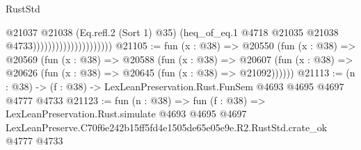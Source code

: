 \begin{lexlean}{RustStd}
\begin{coremodule}
                                          @21037
                                            @21038
                                            (Eq.refl.{2} (Sort 1) @35)
                                            (heq_of_eq.{1}
                                              @4718
                                              @21035
                                              @21038
                                              @4733)))))))))))))))))))))
@21105 := fun (x : @38) =>
  @20550
    (fun (x : @38) =>
    @20569
      (fun (x : @38) =>
      @20588
        (fun (x : @38) =>
        @20607 (fun (x : @38) => @20626 (fun (x : @38) => @20645 (fun (x : @38) => @21092))))))
@21113 := (n : @38) -> (f : @38) -> LexLeanPreservation.Rust.FunSem @4693 @4695 @4697 @4777 @4733
@21123 := fun (n : @38) =>
  fun (f : @38) =>
  LexLeanPreservation.Rust.simulate
    @4693
    @4695
    @4697
    LexLeanPreserve.C70f6e242b15ff5fd4e1505de65e05e9e.R2.RustStd.crate_ok
    @4777
    @4733
\end{coremodule}
\end{lexlean}
